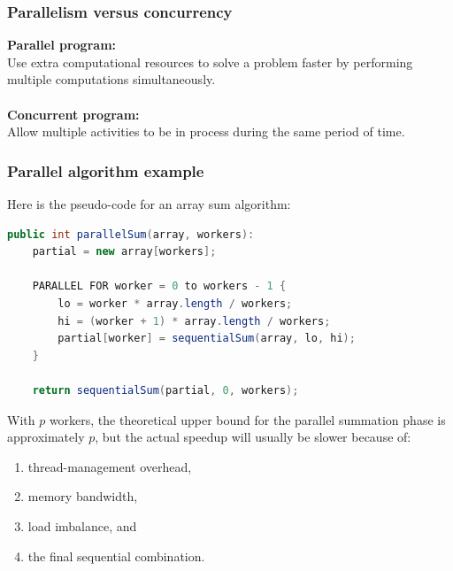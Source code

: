 \documentclass[11pt]{article}
\begin{document}
\subsubsection{Parallelism versus concurrency}
\textbf{Parallel program:}\\
Use extra computational resources to solve a problem faster by performing multiple computations simultaneously.
\\\\
\textbf{Concurrent program:}\\
Allow multiple activities to be in process during the same period of time.
\subsubsection{Parallel algorithm example}
Here is the pseudo-code for an array sum algorithm:
\begin{lstlisting}[language=Java]
public int parallelSum(array, workers):
    partial = new array[workers];

    PARALLEL FOR worker = 0 to workers - 1 {
        lo = worker * array.length / workers;
        hi = (worker + 1) * array.length / workers;
        partial[worker] = sequentialSum(array, lo, hi);
    }

    return sequentialSum(partial, 0, workers);
\end{lstlisting}
\begin{warning}
With $p$ workers, the theoretical upper bound for the parallel summation phase is approximately $p$, but the actual speedup will usually be slower because of:
\begin{enumerate}
    \item thread-management overhead,
    \item memory bandwidth,
    \item load imbalance, and
    \item the final sequential combination.
\end{enumerate}
\end{warning}
\end{document}
